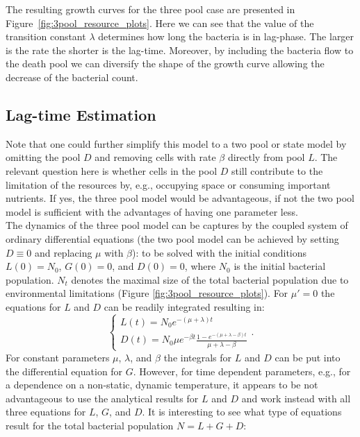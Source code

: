 \documentclass[10pt,A4paper]{article}
\begin{document}
The resulting growth curves for the three pool case are presented in Figure~\ref{fig:3pool_resource_plots}.
Here we can see that the value of the transition constant $\lambda$ determines how long the bacteria is in lag-phase.
The larger is the rate the shorter is the lag-time.
Moreover, by including the bacteria flow to the death pool we can diversify the shape of the growth curve allowing the decrease of the bacterial count.
%
%
%
\subsection{Lag-time Estimation}
Note that one could further simplify this model to a two pool or state model by omitting the pool $D$ and removing cells with rate $\beta$ directly from pool $L$.
The relevant question here is whether cells in the pool $D$ still contribute to the limitation of the resources by, e.g., occupying space or consuming important nutrients.
If yes, the three pool model would be advantageous, if not the two pool model is sufficient with the advantages of having one parameter less.\\
%
The dynamics of the three pool model can be captures by the coupled system of ordinary differential equations (the two pool model can be achieved by setting $D\equiv 0$ and replacing $\mu$ with $\beta$):
to be solved with the initial conditions $L(0)=N_0$, $G(0)=0$, and $D(0)=0$, where $N_0$ is the initial bacterial population.
$N_t$ denotes the maximal size of the total bacterial population due to environmental limitations (Figure \ref{fig:3pool_resource_plots}).
For $\mu'=0$ the equations for $L$ and $D$ can be readily integrated resulting in:
\begin{equation}
    \begin{cases}
        L(t) = N_0 e^{-(\mu+\lambda)t}\\
        D(t) = N_0 \mu e^{-\beta t}\frac{1-e^{-(\mu+\lambda-\beta)t}}{\mu+\lambda-\beta}
    \end{cases}.
\end{equation}
For constant parameters $\mu$, $\lambda$, and $\beta$ the integrals for $L$ and $D$ can be put into the differential equation for $G$.
However, for time dependent parameters, e.g., for a dependence on a non-static, dynamic temperature, it appears to be not advantageous to use the analytical results for $L$ and $D$ and work instead with all three equations for $L$, $G$, and $D$.
It is interesting to see what type of equations result for the total bacterial population $N=L+G+D$:
\end{document}
